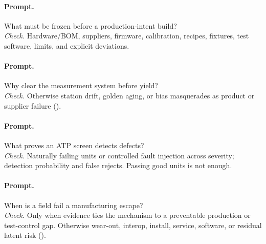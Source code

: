 \paragraph{Prompt.} What must be frozen before a production-intent build?\\
\textit{Check.} Hardware/BOM, suppliers, firmware, calibration, recipes,
fixtures, test software, limits, and explicit deviations.

\paragraph{Prompt.} Why clear the measurement system before yield?\\
\textit{Check.} Otherwise station drift, golden aging, or bias masquerades as
product or supplier failure ().

\paragraph{Prompt.} What proves an ATP screen detects defects?\\
\textit{Check.} Naturally failing units or controlled fault injection across
severity; detection probability and false rejects. Passing good units is not
enough.

\paragraph{Prompt.} When is a field fail a manufacturing escape?\\
\textit{Check.} Only when evidence ties the mechanism to a preventable
production or test-control gap. Otherwise wear-out, interop, install, service,
software, or residual latent risk ().
